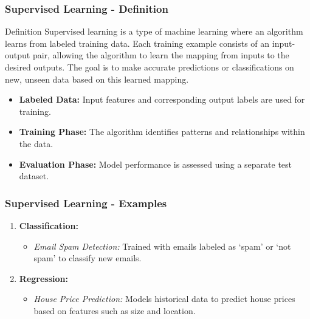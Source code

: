 \documentclass{beamer}
\begin{document}
\begin{frame}[fragile]
    \frametitle{Supervised Learning - Definition}
    \begin{block}{Definition}
        Supervised learning is a type of machine learning where an algorithm learns from labeled training data. 
        Each training example consists of an input-output pair, allowing the algorithm to learn the mapping from inputs to the desired outputs.
        The goal is to make accurate predictions or classifications on new, unseen data based on this learned mapping.
    \end{block}

    \begin{itemize}
        \item \textbf{Labeled Data:} Input features and corresponding output labels are used for training.
        \item \textbf{Training Phase:} The algorithm identifies patterns and relationships within the data.
        \item \textbf{Evaluation Phase:} Model performance is assessed using a separate test dataset.
    \end{itemize}
\end{frame}

\begin{frame}[fragile]
    \frametitle{Supervised Learning - Examples}
    \begin{enumerate}
        \item \textbf{Classification:}
            \begin{itemize}
                \item \textit{Email Spam Detection:} Trained with emails labeled as ‘spam’ or ‘not spam’ to classify new emails.
            \end{itemize}
        \item \textbf{Regression:}
            \begin{itemize}
                \item \textit{House Price Prediction:} Models historical data to predict house prices based on features such as size and location.
            \end{itemize}
    \end{enumerate}
\end{frame}
\end{document}
